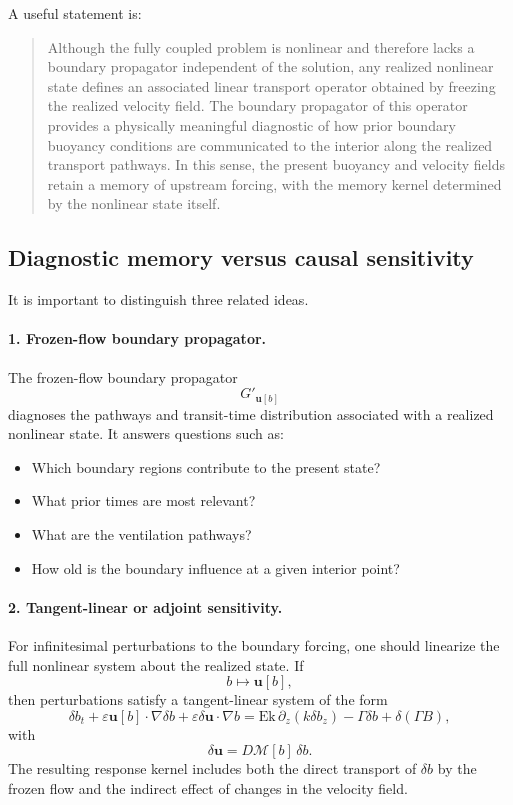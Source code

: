 \documentclass[10pt]{amsart}
\begin{document}
A useful statement is:

\begin{quote}
Although the fully coupled problem is nonlinear and therefore lacks a boundary propagator independent of the solution, any realized nonlinear state defines an associated linear transport operator obtained by freezing the realized velocity field. The boundary propagator of this operator provides a physically meaningful diagnostic of how prior boundary buoyancy conditions are communicated to the interior along the realized transport pathways. In this sense, the present buoyancy and velocity fields retain a memory of upstream forcing, with the memory kernel determined by the nonlinear state itself.
\end{quote}

\subsection{Diagnostic memory versus causal sensitivity}

It is important to distinguish three related ideas.

\paragraph{1. Frozen-flow boundary propagator.}
The frozen-flow boundary propagator
\begin{equation}
G'_{\mathbf u[b]}
\end{equation}
diagnoses the pathways and transit-time distribution associated with a realized nonlinear state. It answers questions such as:
\begin{itemize}
\item Which boundary regions contribute to the present state?
\item What prior times are most relevant?
\item What are the ventilation pathways?
\item How old is the boundary influence at a given interior point?
\end{itemize}

\paragraph{2. Tangent-linear or adjoint sensitivity.}
For infinitesimal perturbations to the boundary forcing, one should linearize the full nonlinear system about the realized state. If
\[
b\mapsto \mathbf u[b],
\]
then perturbations satisfy a tangent-linear system of the form
\begin{equation}
\delta b_t
+
\varepsilon \mathbf u[b]\cdot\nabla \delta b
+
\varepsilon \delta\mathbf u\cdot\nabla b
=
\mathrm{Ek}\,\partial_z(k\delta b_z)
-\Gamma \delta b
+
\delta(\Gamma B),
\end{equation}
with
\begin{equation}
\delta \mathbf u
=
D\mathcal M[b]\,\delta b.
\end{equation}
The resulting response kernel includes both the direct transport of \(\delta b\) by the frozen flow and the indirect effect of changes in the velocity field.
\end{document}
